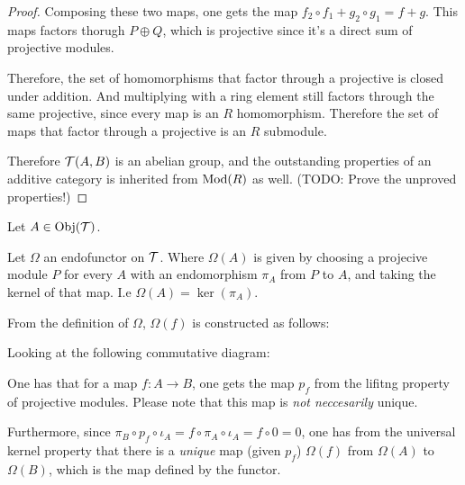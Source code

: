 \begin{proof}
    Composing these two maps, one gets the map \( f_2 \circ f_1 + g_2 \circ g_1 = f + g \). This maps factors thorugh \( P \oplus Q \), which is projective since it's a direct sum of projective modules.

    Therefore, the set of homomorphisms that factor through a projective is closed under addition. And multiplying with a ring element still factors through the same projective, since every map is an \( R \) homomorphism. Therefore the set of maps that factor through a projective is an \( R \) submodule.

    Therefore \( {\mathcal{T}}(A, B) \) is an abelian group, and the outstanding properties of an additive category is inherited from \( \operatorname{Mod}(R) \) as well. (TODO: Prove the unproved properties!)
\end{proof}

\begin{definition}
    Let \( A \in \operatorname{Obj}({\mathcal{T}}) \).

    Let \( \Omega \) an endofunctor on \( {\mathcal{T}} \). Where \( \Omega(A) \) is given by choosing a projecive module \( P \) for every \( A \) with an endomorphism \( \pi_A \) from \( P \) to \( A \), and taking the kernel of that map. I.e \( \Omega(A) = \ker(\pi_A) \).
\end{definition}

\begin{remark}
    From the definition of \( \Omega \), \( \Omega(f) \) is constructed as follows:

    Looking at the following commutative diagram:

    \begin{center}
    \end{center}

    One has that for a map \( f: A \to B \), one gets the map \( p_f \) from the lifitng property of projective modules. Please note that this map is \emph{not neccesarily} unique.

    Furthermore, since \( \pi_B \circ p_f \circ \iota_A = f \circ \pi_A \circ \iota_A = f \circ 0 = 0 \), one has from the universal kernel property that there is a \emph{unique} map (given \( p_f \)) \( \Omega(f) \) from \( \Omega(A) \) to \( \Omega(B) \), which is the map defined by the functor.
\end{remark}

